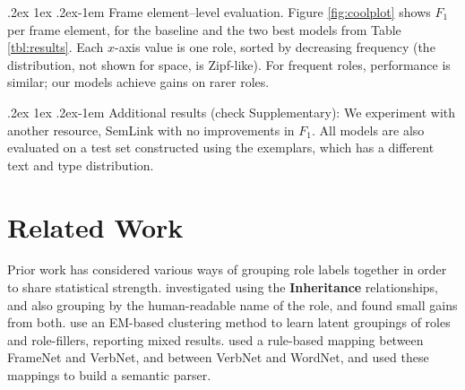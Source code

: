 \documentclass[11pt,a4paper]{article}
\makeatletter
\newcommand{\ensuretext}[1]{#1}
\newcommand{\nssmarker}{\ensuretext{\textcolor{magenta}{\ensuremath{^{\textsc{NS}}_{\textsc{S}}}}}}
\newcommand{\mkmarker}{\ensuretext{\textcolor{red}{\ensuremath{^{\textsc{M}}_{\textsc{K}}}}}}
\newcommand{\arkcomment}[3]{\ensuretext{\textcolor{#3}{[#1 #2]}}}
\newcommand{\nss}[1]{\arkcomment{\nssmarker}{#1}{magenta}}
\newcommand{\mk}[1]{\arkcomment{\mkmarker}{#1}{red}}
\renewcommand{\paragraph}{%
  \@startsection{paragraph}{4}%
  {\z@}{.2ex \@plus 1ex \@minus .2ex}{-1em}%
  {\normalfont\normalsize\bfseries}%
}
\newcommand{\finalversion}[1]{}
\makeatother
\begin{document}
\paragraph{Frame element--level evaluation.}
Figure \ref{fig:coolplot} shows $F_1$ per frame element, for the
baseline and the two best models from Table \ref{tbl:results}.  Each
$x$-axis value is one role, sorted by decreasing frequency (the
distribution, not shown for space, is Zipf-like).  For frequent roles,
performance is similar; our models achieve gains on rarer roles.

\paragraph{Additional results} (check Supplementary): We experiment with another resource,
SemLink \citep{bonial-13} with no improvements in $F_1$. All models are also evaluated
on a test set constructed using the exemplars, which has a different text and type distribution.


\finalversion{\nss{impact of automatic frames?}}


\section{Related Work}

Prior work has %
considered various ways of grouping role labels together in order to share statistical strength. 
\citet{matsubayashi-09} investigated using the \textbf{Inheritance} relationships, and also grouping by the human-readable name of the role, and found small gains from both.
\citet{baldewein-04} use an EM-based clustering method to learn latent groupings of roles and role-fillers, reporting mixed results.
\citet{shi-05} used a rule-based mapping between FrameNet and VerbNet, and between VerbNet and WordNet, and used these mappings to build a semantic parser.
\end{document}
